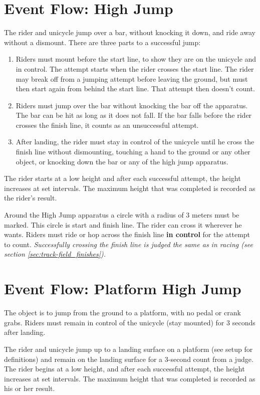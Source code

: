 \section{Event Flow: High Jump}
The rider and unicycle jump over a bar, without knocking it down, and ride away without a dismount.
There are three parts to a successful jump: 
\begin{enumerate}
\item Riders must mount before the start line, to show they are on the unicycle and in control.
The attempt starts when the rider crosses the start line.
The rider may break off from a jumping attempt before leaving the ground, but must then start again from behind the start line.
That attempt then doesn't count.
\item Riders must jump over the bar without knocking the bar off the apparatus.
The bar can be hit as long as it does not fall.
If the bar falls before the rider crosses the finish line, it counts as an unsuccessful attempt.
\item After landing, the rider must stay in control of the unicycle until he cross the finish line without dismounting, touching a hand to the ground or any other object, or knocking down the bar or any of the high jump apparatus.
\end{enumerate}
The rider starts at a low height and after each successful attempt, the height increases at set intervals.
The maximum height that was completed is recorded as the rider's result.

Around the High Jump apparatus a circle with a radius of 3 meters must be marked.
This circle is start and finish line.
The rider can cross it wherever he wants.
Riders must ride or hop across the finish line \textbf{in control} for the attempt to count.
\textit{Successfully crossing the finish line is judged the same as in racing (see section \ref{sec:track-field_finishes}).}

\section{Event Flow: Platform High Jump}
The object is to jump from the ground to a platform, with no pedal or crank grabs.
Riders must remain in control of the unicycle (stay mounted) for 3 seconds after landing.

The rider and unicycle jump up to a landing surface on a platform (see setup for definitions) and remain on the landing surface for a 3-second count from a judge.
The rider begins at a low height, and after each successful attempt, the height increases at set intervals.
The maximum height that was completed is recorded as his or her result.

